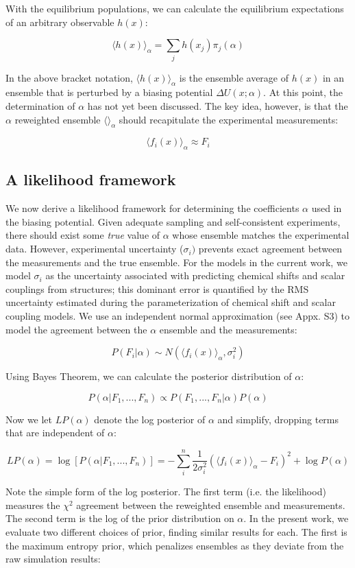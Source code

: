 \documentclass[11pt,titlepage]{article}
\begin{document}
With the equilibrium populations, we can calculate the equilibrium expectations of an arbitrary observable $h(x)$:

$$\langle h(x)\rangle _\alpha = \sum_j h(x_j) \pi_j(\alpha)$$

In the above bracket notation, $\langle h(x)\rangle _\alpha$ is the ensemble average of $h(x)$ in an ensemble that is perturbed by a biasing potential $\Delta U(x;\alpha)$.  At this point, the determination of $\alpha$ has not yet been discussed.  The key idea, however, is that the $\alpha$ reweighted ensemble $\langle \rangle _\alpha$ should recapitulate the experimental measurements:

$$\langle f_i(x)\rangle _\alpha \approx F_i$$


\subsection*{A likelihood framework}

We now derive a likelihood framework for determining the coefficients $\alpha$ used in the biasing potential.  Given adequate sampling and self-consistent experiments, there should exist some \emph{true} value of $\alpha$ whose ensemble matches the experimental data.  However, experimental uncertainty ($\sigma_i)$ prevents exact agreement between the measurements and the true ensemble.  For the models in the current work, we model $\sigma_i$ as the uncertainty associated with predicting chemical shifts and scalar couplings from structures; this dominant error is quantified by the RMS uncertainty estimated during the parameterization of chemical shift and scalar coupling models.  We use an independent normal approximation (see Appx. S3) to model the agreement between the $\alpha$ ensemble and the measurements:

$$P(F_i | \alpha) \sim N(\langle f_i(x)\rangle _\alpha, \sigma_i^2)$$

Using Bayes Theorem, we can calculate the posterior distribution of $\alpha$:

$$P(\alpha | F_1, ..., F_n) \propto P(F_1, ..., F_n | \alpha) P(\alpha)$$

Now we let $LP(\alpha)$ denote the log posterior of $\alpha$ and simplify, dropping terms that are independent of $\alpha$:

$$LP(\alpha) = \log[ P(\alpha|F_1, ..., F_n)] = -\sum_i^n \frac{1}{2\sigma_i^2}(\langle f_i(x)\rangle _\alpha - F_i)^2 + \log P(\alpha)$$

Note the simple form of the log posterior.  The first term (i.e. the likelihood) measures the $\chi^2$ agreement between the reweighted ensemble and measurements.  The second term is the log of the prior distribution on $\alpha$.  In the present work, we evaluate two different choices of prior, finding similar results for each.  The first is the maximum entropy prior, which penalizes ensembles as they deviate from the raw simulation results:
\end{document}
